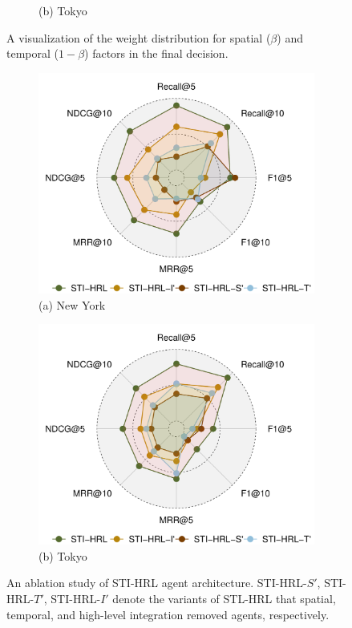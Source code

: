 \documentclass[letterpaper]{article} %
\begin{document}
\begin{figure}[!th]
\begin{subfigure}{.24\textwidth}
  \scriptsize (b) Tokyo
\end{subfigure}
\caption{A visualization of the weight distribution for spatial ($\beta$) and temporal ($1-\beta$) factors in the final decision.}
\label{fig: spatial-temporal factors}
\end{figure}


\begin{figure}[!th]
\centering
\begin{subfigure}{.24\textwidth}
  \centering
  \includegraphics[width=\linewidth]{5_nyc.pdf}
  \scriptsize (a) New York
\end{subfigure}%
\begin{subfigure}{.24\textwidth}
  \centering
  \includegraphics[width=\linewidth]{5_tky.pdf}
  \scriptsize (b) Tokyo
\end{subfigure}
\caption{An ablation study of STI-HRL agent architecture. STI-HRL-$S'$, STI-HRL-$T'$, STI-HRL-$I'$ denote the variants of STL-HRL that spatial, temporal, and high-level integration removed agents, respectively.}
\label{Fig: ablation study on agents}
\end{figure}
\end{document}
